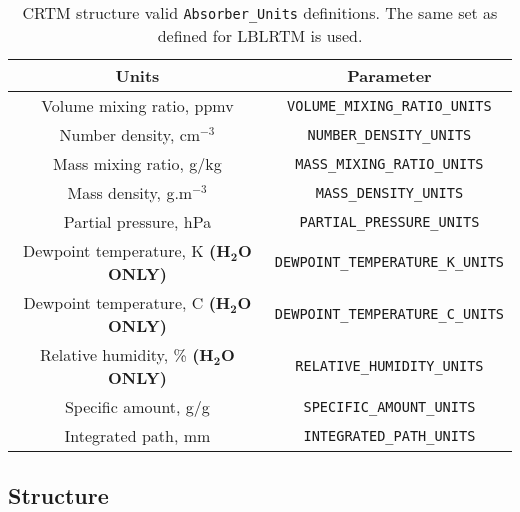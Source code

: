 \begin{table}
  \centering
  \begin{tabular}{|c|c|}
    \hline
    \sffamily\textbf{Units} & \sffamily\textbf{Parameter} \\
    \hline\hline
     Volume mixing ratio, ppmv                       & \texttt{VOLUME\_MIXING\_RATIO\_UNITS} \\
     Number density, cm$^{-3}$                       & \texttt{NUMBER\_DENSITY\_UNITS} \\
     Mass mixing ratio, g/kg                         & \texttt{MASS\_MIXING\_RATIO\_UNITS} \\
     Mass density, g.m$^{-3}$                        & \texttt{MASS\_DENSITY\_UNITS} \\
     Partial pressure, hPa                           & \texttt{PARTIAL\_PRESSURE\_UNITS} \\
     Dewpoint temperature, K  \textbf{(H$\mathbf{_2}$O ONLY)} & \texttt{DEWPOINT\_TEMPERATURE\_K\_UNITS} \\
     Dewpoint temperature, C  \textbf{(H$\mathbf{_2}$O ONLY)} & \texttt{DEWPOINT\_TEMPERATURE\_C\_UNITS} \\
     Relative humidity, \%    \textbf{(H$\mathbf{_2}$O ONLY)} & \texttt{RELATIVE\_HUMIDITY\_UNITS} \\
     Specific amount, g/g                            & \texttt{SPECIFIC\_AMOUNT\_UNITS} \\
     Integrated path, mm                             & \texttt{INTEGRATED\_PATH\_UNITS} \\
    \hline
  \end{tabular}
  \caption{CRTM \Atmosphere{} structure valid \texttt{Absorber\_Units} definitions. The same set as defined for LBLRTM is used.}
  \label{tab:absorber_units}
\end{table}

\subsection{\Cloud{} Structure}
\label{sec:cloud_structure}

